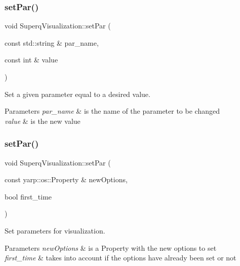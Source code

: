 \subsubsection{\texorpdfstring{set\+Par()}{setPar()}\hspace{0.1cm}{\footnotesize\ttfamily [2/3]}}
{\footnotesize\ttfamily void Superq\+Visualization\+::set\+Par (\begin{DoxyParamCaption}\item[{const std\+::string \&}]{par\+\_\+name,  }\item[{const int \&}]{value }\end{DoxyParamCaption})}



Set a given parameter equal to a desired value. 


\begin{DoxyParams}{Parameters}
{\em par\+\_\+name} & is the name of the parameter to be changed \\
\hline
{\em value} & is the new value \\
\hline
\end{DoxyParams}
\mbox{\label{classSuperqVisualization_a5250a90e5865bf45c0bd8ae919b8eab0}} 
\subsubsection{\texorpdfstring{set\+Par()}{setPar()}\hspace{0.1cm}{\footnotesize\ttfamily [3/3]}}
{\footnotesize\ttfamily void Superq\+Visualization\+::set\+Par (\begin{DoxyParamCaption}\item[{const yarp\+::os\+::\+Property \&}]{new\+Options,  }\item[{bool}]{first\+\_\+time }\end{DoxyParamCaption})}



Set parameters for visualization. 


\begin{DoxyParams}{Parameters}
{\em new\+Options} & is a Property with the new options to set \\
\hline
{\em first\+\_\+time} & takes into account if the options have already been set or not \\
\hline
\end{DoxyParams}
\mbox{\label{classSuperqVisualization_aea374f59e3b941e688c1ddafad8896b9}} 

